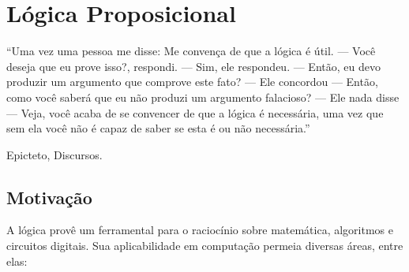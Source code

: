 \chapter{L\'ogica Proposicional}\label{cap2}

\epigraph{``Uma vez uma pessoa me disse: Me convença de que a lógica é
útil. --- Você deseja que eu prove isso?, respondi. --- Sim, ele
respondeu. --- Então, eu devo produzir um argumento que comprove este
fato? --- Ele concordou --- Então, como você saberá que eu não produzi
um argumento falacioso? --- Ele nada disse --- Veja, você acaba de se
convencer de que a lógica é necessária, uma vez que sem ela você não é
capaz de saber se esta é ou não necessária.''}{Epicteto, Discursos.}

\section{Motiva\c{c}\~ao}

A l\'ogica prov\^e um ferramental para o racioc\'inio sobre matem\'atica, algoritmos e circuitos digitais. Sua aplicabilidade em computa\c{c}\~ao permeia diversas \'areas, entre elas:

